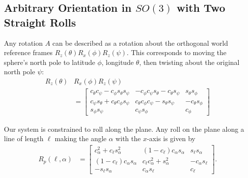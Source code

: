\documentclass[letter paper, 10pt, conference]{ieeeconf}
\begin{document}
 \subsection{Arbitrary Orientation in $SO(3)$ with Two Straight Rolls}
  Any rotation $A$ can be described as a rotation about the orthogonal world reference frames $R_z(\theta)R_x(\phi)R_z(\psi)$.  This corresponds to moving the sphere's north pole to latitude $\phi$, longitude $\theta$, then twisting about the original north pole $\psi$:
 \begin{align*}
R_z(\theta)&R_x(\phi)R_z(\psi) \\
&= \left[
\begin{array}{ccc}
 c_{\theta} c_{\psi} -c_{\phi} s_{\theta} s_{\psi} & -c_{\phi} c_{\psi} s_{\theta} -c_{\theta} s_{\psi} & s_{\theta} s_{\phi} \\
 c_{\psi} s_{\theta}+c_{\theta} c_{\phi} s_{\psi} & c_{\theta} c_{\phi} c_{\psi}-s_{\theta} s_{\psi} & -c_{\theta} s_{\phi} \\
 s_{\phi} s_{\psi} & c_{\psi}s_{\phi} & c_{\phi}
\end{array}
\right]
 \end{align*}
 
Our system is constrained to roll along the plane. Any roll on the plane along a line of length $\ell$  making the angle $\alpha$ with the $x$-axis is given by
 \begin{align*} R_{p}(\ell,\alpha) &=
 \left[
\begin{array}{ccc}
 c_{\alpha}^2+c_{\ell} s_{\alpha}^2 & (1-c_{\ell}) c_{\alpha} s_{\alpha} & s_{\ell} s_{\alpha} \\
 (1-c_{\ell}) c_{\alpha} s_{\alpha} & c_{\ell} c_{\alpha}^2+s_{\alpha}^2 & -c_{\alpha} s_{\ell} \\
 -s_{\ell} s_{\alpha} & c_{\alpha} s_{\ell} & c_{\ell}
\end{array}
\right].
  \end{align*}
  
\end{document}
